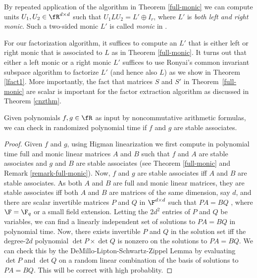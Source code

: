 \begin{remark}\label{remark-full-monic}
By repeated application of the algorithm in Theorem \ref{full-monic}
we can compute units $U_1,U_2\in\fR^{d\times d}$ such that $U_1 L U_2
= L' \oplus I_r$, where $L'$ is \emph{both left and right monic}. Such
a two-sided monic $L'$ is called \emph{monic} in \cite{Cohnfir}.

For our factorization algorithm, it suffices to compute an $L'$ that
is either left or right monic that is associated to $L$ as in Theorem
\ref{full-monic}. It turns out that either a left monic or a right
monic $L'$ suffices to use Ronyai's common invariant subspace
algorithm to factorize $L'$ (and hence also $L$) as we show in Theorem
\ref{lfact1}. More importantly, the fact that matrices $S$ and $S'$ in
Theorem~\ref{full-monic} are scalar is important for the factor
extraction algorithm as discussed in Theorem \ref{cnzthm}.
\end{remark}

\begin{lemma}\label{stable-algo}
  Given polynomials $f,g\in\fR$ as input by noncommutative arithmetic
  formulas, we can check in randomized polynomial time if $f$ and $g$
  are stable associates.
\end{lemma}

\begin{proof}
  Given $f$ and $g$, using Higman linearization we first compute in
  polynomial time full and monic linear matrices $A$ and $B$ such that
  $f$ and $A$ are stable associates and $g$ and $B$ are stable
  associates (see Theorem \ref{full-monic} and Remark
  \ref{remark-full-monic}). Now, $f$ and $g$ are stable associates iff
  $A$ and $B$ are stable associates. As both $A$ and $B$ are full and
  monic linear matrices, they are stable associates iff both $A$ and
  $B$ are matrices of the same dimension, say $d$, and there are
  scalar invertible matrices $P$ and $Q$ in $\F^{d\times d}$ such that
  $PA=BQ$ \cite[Theorem 5.8.3]{Cohnfir}, where $\F=\F_q$ or a small field extension. Letting the
  $2d^2$ entries of $P$ and $Q$ be variables, we can find a linearly
  independent set of solutions to $PA=BQ$ in polynomial time. Now,
  there exists invertible $P$ and $Q$ in the solution set iff the
  degree-$2d$ polynomial $\det P \times \det Q$ is nonzero on the
  solutions to $PA=BQ$. We can check this by the
  DeMillo-Lipton-Schwartz-Zippel Lemma \cite{DL78,Sch80,Zip79} by
  evaluating $\det P$ and $\det Q$ on a random linear combination of
  the basis of solutions to $PA=BQ$. This will be correct with high
  probablity.
\end{proof}


